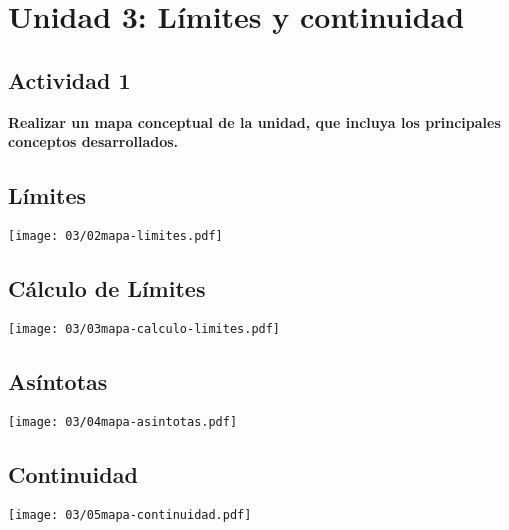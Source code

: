 \section*{Unidad 3: Límites y continuidad}

\subsection*{Actividad 1}

\textbf{Realizar un mapa conceptual de la unidad, que incluya los
principales conceptos desarrollados.}

\subsection*{Límites}
\begin{center}
	\texttt{[image: 03/02mapa-limites.pdf]}
\end{center}

\subsection*{Cálculo de Límites}
\begin{center}
	\texttt{[image: 03/03mapa-calculo-limites.pdf]}
\end{center}

\subsection*{Asíntotas}
\begin{center}
	\texttt{[image: 03/04mapa-asintotas.pdf]}
\end{center}

\subsection*{Continuidad}
\begin{center}
	\texttt{[image: 03/05mapa-continuidad.pdf]}
\end{center}
